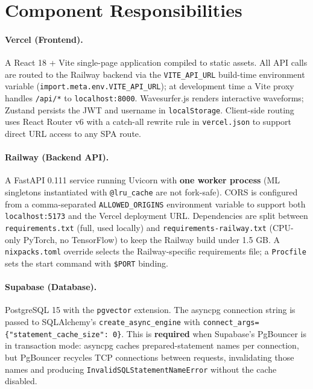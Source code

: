 \documentclass[12pt,letterpaper]{report}
\begin{document}
\section{Component Responsibilities}

\paragraph{Vercel (Frontend).}
A React 18 + Vite single-page application compiled to static assets. All API calls are routed to the Railway backend via the \texttt{VITE\_API\_URL} build-time environment variable (\texttt{import.meta.env.VITE\_API\_URL}); at development time a Vite proxy handles \texttt{/api/*} to \texttt{localhost:8000}. Wavesurfer.js renders interactive waveforms; Zustand persists the JWT and username in \texttt{localStorage}. Client-side routing uses React Router v6 with a catch-all rewrite rule in \texttt{vercel.json} to support direct URL access to any SPA route.

\paragraph{Railway (Backend API).}
A FastAPI 0.111 service running Uvicorn with \textbf{one worker process} (ML singletons instantiated with \texttt{@lru\_cache} are not fork-safe). CORS is configured from a comma-separated \texttt{ALLOWED\_ORIGINS} environment variable to support both \texttt{localhost:5173} and the Vercel deployment URL. Dependencies are split between \texttt{requirements.txt} (full, used locally) and \texttt{requirements-railway.txt} (CPU-only PyTorch, no TensorFlow) to keep the Railway build under 1.5 GB. A \texttt{nixpacks.toml} override selects the Railway-specific requirements file; a \texttt{Procfile} sets the start command with \texttt{\$PORT} binding.

\paragraph{Supabase (Database).}
PostgreSQL 15 with the \texttt{pgvector} extension. The asyncpg connection string is passed to SQLAlchemy's \texttt{create\_async\_engine} with \texttt{connect\_args=\{"statement\_cache\_size": 0\}}. This is \textbf{required} when Supabase's PgBouncer is in transaction mode: asyncpg caches prepared-statement names per connection, but PgBouncer recycles TCP connections between requests, invalidating those names and producing \texttt{InvalidSQLStatementNameError} without the cache disabled.
\end{document}
